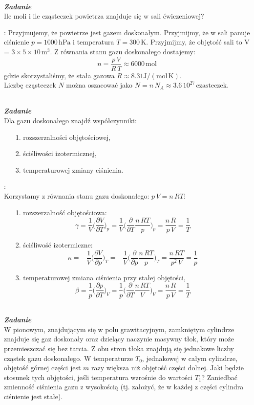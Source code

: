 \documentclass[11pt,a4paper]{article}
\newcounter{zadanie}\newcommand{\zadanie}[1][]{\addtocounter{zadanie}{1} ~\\  {\bf \emph{Zadanie \arabic{zadanie} #1 }} \\}
\begin{document}
\clearpage

\zadanie
Ile moli i ile cząsteczek powietrza znajduje się w sali ćwiczeniowej?

\vspace{2mm}{\bf Rozwiązanie}:
Przyjmujemy, że powietrze jest gazem doskonałym. Przyjmijmy, że w sali panuje ciśnienie $p = 1000\,\textrm{hPa}$ i temperatura $T = 300\,\textrm{K}$. Przyjmijmy, że objętość sali to V = $3\times 5\times 10\,\textrm{m}^3$.
Z równania stanu gazu doskonałego dostajemy:
\[
n = \frac{p\,V}{R\,T} \approx 6000\,\textrm{mol}
\]
gdzie skorzystaliśmy, że stała gazowa $R \approx 8.31 \textrm{J}/(\textrm{mol}\,\textrm{K})$.\\
Liczbę cząsteczek $N$ można oszacować jako $N = n\,N_A \approx 3.6\,10^{27}\,\textrm{czasteczek}$.

\clearpage

\zadanie
Dla gazu doskonałego znajdź współczynniki:
\begin{itemize}
\item[1.] rozszerzalności objętościowej,
\item[2.] ściśliwości izotermicznej,
\item[3.] temperaturowej zmiany ciśnienia.
\end{itemize}

\vspace{2mm}{\bf Rozwiązanie}:\\
Korzystamy z równania stanu gazu doskonałego: $p\,V = n\,RT$:

\begin{itemize}
\item[1.] rozszerzalność objętościowa:
 \[
  \gamma = \frac{1}{V}\bigg(\frac{\partial V}{\partial T}\bigg)_p = 
  \frac{1}{V}\bigg(\frac{\partial}{\partial T}\frac{n\,RT}{p}\bigg)_p = \frac{n\,R}{p\,V}=\frac{1}{T}
 \]
\item[2.] ściśliwość izotermiczne:
 \[
  \kappa = -\frac{1}{V}\bigg(\frac{\partial V}{\partial p}\bigg)_T =
  -\frac{1}{V}\bigg(\frac{\partial}{\partial p}\frac{n\,RT}{p}\bigg)_T = \frac{n\,RT}{p^2\,V} = \frac{1}{p}
 \]
\item[3.] temperaturowej zmiana ciśnienia przy stałej objętości,
 \[
  \beta = \frac{1}{p}\bigg(\frac{\partial p}{\partial T}\bigg)_V =
  \frac{1}{p}\bigg(\frac{\partial}{\partial T}\frac{n\,RT}{V}\bigg)_V = \frac{n\,R}{p\,V} = \frac{1}{T}
 \]
\end{itemize}


\clearpage

\zadanie
W pionowym, znajdującym się w polu grawitacyjnym, zamkniętym cylindrze znajduje się gaz doskonały oraz dzielący naczynie masywny tłok, który może przemieszczać się bez tarcia. Z obu stron tłoka znajdują się jednakowe liczby cząstek gazu doskonałego. W temperaturze $T_0$, jednakowej w całym cylindrze, objętość górnej części jest $m$ razy większa niż objętość części dolnej. Jaki będzie stosunek tych objętości, jeśli temperatura wzrośnie do wartości $T_1$? Zaniedbać zmienność ciśnienia gazu z wysokością (tj. założyć, że w każdej z części cylindra ciśnienie jest stałe).
\end{document}
